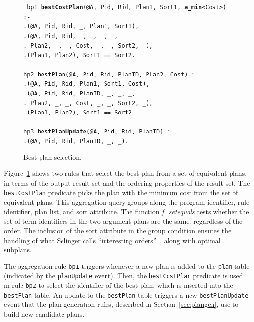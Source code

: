 \documentclass{sigmod08}
\newcommand{\datalogspace}{\textcolor[gray]{1}{.}\hspace{0.5in}}
\newcommand{\ol}[1]{\texttt{\small #1}\xspace}
\begin{document}
\begin{figure}
\centering
\begin{boxedminipage}{\linewidth}
\scriptsize{\tt
bp1 {\small \bf bestCostPlan}(@A, Pid, Rid, Plan1, Sort1, {\small \bf a\_min}<Cost>) :- \\
\datalogspace {\small \bf planUpdate}(@A, Pid, Rid, \_, Plan1, Sort1), \\
\datalogspace {\small \bf plan}(@A, Pid, Rid, \_, \_, \_, \_, \\
\datalogspace  \xspace \xspace \xspace Plan2, \_, \_, Cost, \_, \_, Sort2, \_), \\
\datalogspace {\em f\_setequals}(Plan1, Plan2), Sort1 == Sort2. \\
\\            
bp2 {\small \bf bestPlan}(@A, Pid, Rid, PlanID, Plan2, Cost) :- \\
\datalogspace {\small \bf bestCostPlan}(@A, Pid, Rid, Plan1, Sort1, Cost), \\
\datalogspace {\small \bf plan}(@A, Pid, Rid, PlanID, \_, \_, \_, \\
\datalogspace \xspace \xspace \xspace Plan2, \_, \_, Cost, \_, \_, Sort2, \_), \\
\datalogspace {\em f\_setequals}(Plan1, Plan2), Sort1 == Sort2.\\
\\            
bp3 {\small \bf bestPlanUpdate}(@A, Pid, Rid, PlanID) :- \\
\datalogspace {\small \bf bestPlan}(@A, Pid, Rid, PlanID, \_, \_).
}
\caption{\label{fig:bestplan}Best plan selection.}
\end{boxedminipage}
\end{figure}

Figure~\ref{fig:bestplan} shows two rules that select the best plan from a 
set of equivalent plans, in terms of the output result set and the ordering 
properties of the result set. The \ol{bestCostPlan} predicate picks the
plan with the minimum cost from the set of equivalent plans. This aggregation 
query groups along the program identifier, rule identifier, plan list, and sort
attribute. The function {\em f\_setequals} tests whether the set of term identifiers in the two argument plans are the same, regardless of the order. The inclusion
of the sort attribute in the group condition ensures the handling of what Selinger calls ``interesting orders''~\cite{selinger}, along with optimal subplans.
 
The aggregation rule \ol{bp1} triggers whenever a new plan is added to the \ol{plan} 
table (indicated by the \ol{planUpdate} event). Then, the \ol{bestCostPlan} predicate is used 
in rule \ol{bp2} to select the identifier of the best plan, which is inserted into the \ol{bestPlan} 
table. An update to the \ol{bestPlan} table triggers a new \ol{bestPlanUpdate} event that the 
plan generation rules, described in Section~\ref{sec:plangen}, use to build new candidate plans.
\end{document}
